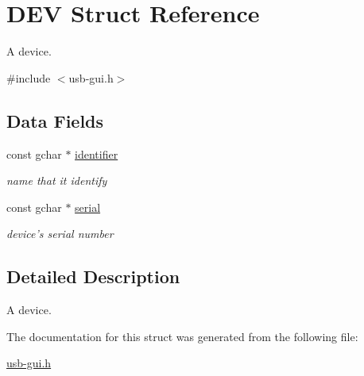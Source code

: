 \hypertarget{structDEV}{
\section{DEV Struct Reference}
\label{structDEV}
}


A device.  




{\ttfamily \#include $<$usb-\/gui.h$>$}

\subsection*{Data Fields}
\begin{DoxyCompactItemize}
\item 
\hypertarget{structDEV_a736a53626b167d0ece45686018767faf}{
const gchar $\ast$ \hyperlink{structDEV_a736a53626b167d0ece45686018767faf}{identifier}}
\label{structDEV_a736a53626b167d0ece45686018767faf}

\begin{DoxyCompactList}\small\item\em name that it identify \item\end{DoxyCompactList}\item 
\hypertarget{structDEV_a57c84f9f07eb483ad53ef7e0bc214426}{
const gchar $\ast$ \hyperlink{structDEV_a57c84f9f07eb483ad53ef7e0bc214426}{serial}}
\label{structDEV_a57c84f9f07eb483ad53ef7e0bc214426}

\begin{DoxyCompactList}\small\item\em device's serial number \item\end{DoxyCompactList}\end{DoxyCompactItemize}


\subsection{Detailed Description}
A device. 

The documentation for this struct was generated from the following file:\begin{DoxyCompactItemize}
\item 
\hyperlink{usb-gui_8h}{usb-\/gui.h}\end{DoxyCompactItemize}
